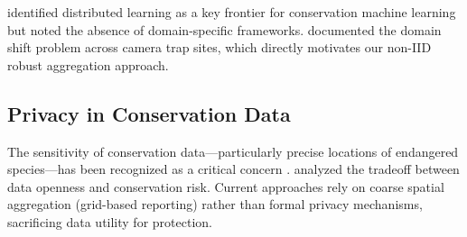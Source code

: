 \citet{tuia2022perspectives} identified distributed learning as a key frontier for conservation machine learning but noted the absence of domain-specific frameworks.
\citet{beery2021iwildcam} documented the domain shift problem across camera trap sites, which directly motivates our non-IID robust aggregation approach.

\subsection{Privacy in Conservation Data}

The sensitivity of conservation data---particularly precise locations of endangered species---has been recognized as a critical concern \citep{lindenmayer2017do}.
\citet{tulloch2018decision} analyzed the tradeoff between data openness and conservation risk.
Current approaches rely on coarse spatial aggregation (grid-based reporting) rather than formal privacy mechanisms, sacrificing data utility for protection.

